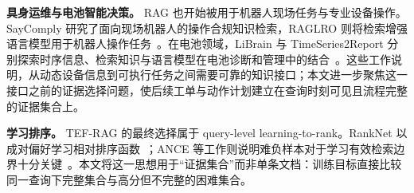 \textbf{具身运维与电池智能决策。}
RAG 也开始被用于机器人现场任务与专业设备操作。SayComply 研究了面向现场机器人的操作合规知识检索，RAGLRO 则将检索增强语言模型用于机器人操作任务~\cite{ginting2025saycomply,wang2026raglro}。在电池领域，LiBrain 与 TimeSeries2Report 分别探索时序信息、检索知识与语言模型在电池诊断和管理中的结合~\cite{li2026librain,yang2026timeseries2report}。这些工作说明，从动态设备信息到可执行任务之间需要可靠的知识接口；本文进一步聚焦这一接口之前的证据选择问题，使后续工单与动作计划建立在查询时刻可见且流程完整的证据集合上。

\textbf{学习排序。}
TEF-RAG 的最终选择属于 query-level learning-to-rank。RankNet 以成对偏好学习相对排序函数~\cite{burges2005ranknet}；ANCE 等工作则说明难负样本对于学习有效检索边界十分关键~\cite{xiong2021ance}。本文将这一思想用于“证据集合”而非单条文档：训练目标直接比较同一查询下完整集合与高分但不完整的困难集合。
